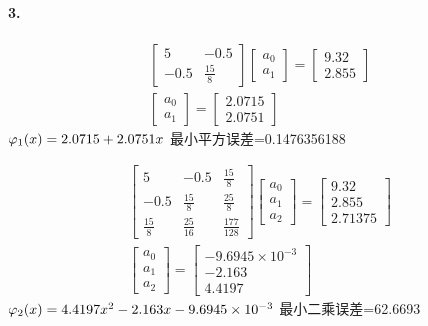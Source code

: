 \documentclass[UTF8]{ctexart}
\begin{document}
	\paragraph{3.}
	\begin{displaymath}
	\begin{gathered}
		\begin{bmatrix}
			5 & -0.5\\
			-0.5 & \frac{15}{8}
		\end{bmatrix}
		\begin{bmatrix}
			a_0\\
			a_1
		\end{bmatrix}
		=
		\begin{bmatrix}
			9.32\\
			2.855
		\end{bmatrix}
		\\
		\begin{bmatrix}
			a_0\\
			a_1
		\end{bmatrix}
		=
		\begin{bmatrix}
			2.0715\\
			2.0751
		\end{bmatrix}		
	\end{gathered}
	\end{displaymath}
	$\varphi_1(x)=2.0715+2.0751x\\$
	最小平方误差=0.1476356188
	
	\begin{displaymath}
	\begin{gathered}
		\begin{bmatrix}
			5 & -0.5 & \frac{15}{8}\\
			-0.5 & \frac{15}{8} & \frac{25}{8}\\
			\frac{15}{8} & \frac{25}{16} & \frac{177}{128}
		\end{bmatrix}
		\begin{bmatrix}
			a_0\\a_1\\a_2
		\end{bmatrix}
		=
		\begin{bmatrix}
			9.32\\2.855\\2.71375
		\end{bmatrix}
		\\
		\begin{bmatrix}
			a_0\\a_1\\a_2
		\end{bmatrix}
		=
		\begin{bmatrix}
			-9.6945\times 10^{-3}\\-2.163\\4.4197
		\end{bmatrix}
	\end{gathered}
	\end{displaymath}
	$\varphi_2(x)=4.4197x^2-2.163x-9.6945\times 10^{-3}\\$
	最小二乘误差=62.6693
	
\end{document}
